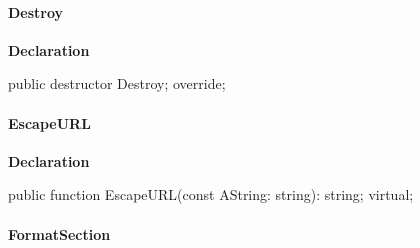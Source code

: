 \documentclass{report}
\newif\ifpdf
\begin{document}
\paragraph*{Destroy}\hspace*{\fill}

\label{PasDoc_GenLatex.TTexDocGenerator-Destroy}
\begin{list}{}{
\setlength{\itemindent}{0cm}
\setlength{\listparindent}{0cm}
\setlength{\leftmargin}{\evensidemargin}
\addtolength{\leftmargin}{\tmplength}
\settowidth{\labelsep}{X}
\addtolength{\leftmargin}{\labelsep}
\setlength{\labelwidth}{\tmplength}
}
\item[\textbf{Declaration}\hfill]
\ifpdf
\begin{flushleft}
\fi
\begin{ttfamily}
public destructor Destroy; override;\end{ttfamily}

\ifpdf
\end{flushleft}
\fi

\end{list}
\paragraph*{EscapeURL}\hspace*{\fill}

\label{PasDoc_GenLatex.TTexDocGenerator-EscapeURL}
\begin{list}{}{
\setlength{\itemindent}{0cm}
\setlength{\listparindent}{0cm}
\setlength{\leftmargin}{\evensidemargin}
\addtolength{\leftmargin}{\tmplength}
\settowidth{\labelsep}{X}
\addtolength{\leftmargin}{\labelsep}
\setlength{\labelwidth}{\tmplength}
}
\item[\textbf{Declaration}\hfill]
\ifpdf
\begin{flushleft}
\fi
\begin{ttfamily}
public function EscapeURL(const AString: string): string; virtual;\end{ttfamily}

\ifpdf
\end{flushleft}
\fi

\end{list}
\paragraph*{FormatSection}\hspace*{\fill}
\end{document}
